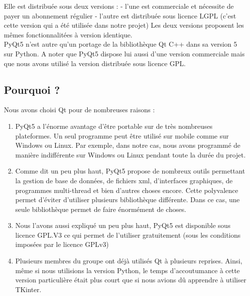 Elle est distribuée sous deux versions : \newline
- l'une est commerciale et nécessite de payer un abonnement régulier\newline
- l'autre est distribuée sous licence LGPL (c'est cette version qui a été utilisée dans notre projet)
Les deux versions proposent les mêmes fonctionnalitées à version identique.\\

PyQt5 n'est autre qu'un portage de la bibliothèque Qt C++ dans sa version 5 sur Python.\newline
A noter que PyQt5 dispose lui aussi d'une version commerciale mais que nous avons utilisé la version distribuée sous licence GPL.

\subsection{Pourquoi ?}

Nous avons choisi Qt pour de nombreuses raisons :
\begin{enumerate}
    \item {}\newline PyQt5 a l'énorme avantage d'être portable sur de très nombreuses plateformes. Un seul programme peut être utilisé sur mobile comme sur Windows ou Linux.\newline
    Par exemple, dans notre cas, nous avons programmé de manière indifférente sur Windows ou Linux pendant toute la durée du projet.
    
    \item {}\newline Comme dit un peu plus haut, PyQt5 propose de nombreux outils permettant la gestion de base de données, de fichiers xml, d'interfaces graphiques, de programmes multi-thread et bien d'autres choses encore. Cette polyvalence permet d'éviter d'utiliser plusieurs bibliothèque différente. Dans ce cas, une seule bibliothèque permet de faire énormément de choses.
    
    \item {}\newline Nous l'avons aussi expliqué un peu plus haut, PyQt5 est disponible sous licence GPL.V3 ce qui permet de l'utiliser gratuitement (sous les conditions imposées par le licence GPLv3)
    
    \item {}\newline Plusieurs membres du groupe ont déjà utilisés Qt à plusieurs reprises. Ainsi, même si nous utilisions la version Python, le temps d'accoutumance à cette version particulière était plus court que si nous avions dû apprendre à utiliser TKinter.
\end{enumerate}

